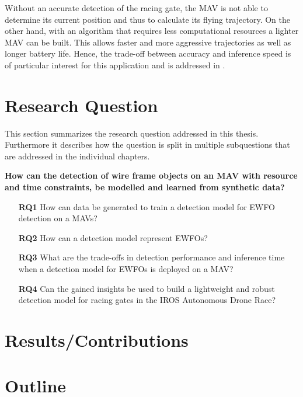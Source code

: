 Without an accurate detection of the racing gate, the \ac{MAV} is not able to determine its current position and thus to calculate its flying trajectory. On the other hand, with an algorithm that requires less computational resources a lighter \ac{MAV} can be built. This allows faster and more aggressive trajectories as well as longer battery life. Hence, the trade-off between accuracy and inference speed is of particular interest for this application and is addressed in .

\section{Research Question}

This section summarizes the research question addressed in this thesis. Furthermore it describes how the question is split in multiple subquestions that are addressed in the individual chapters.

	\textbf{How can the detection of wire frame objects on an \ac{MAV} with resource and time constraints, be modelled and learned from synthetic data?}


\begin{enumerate}
	\item[\textbf{RQ1}]How can data be generated to train a detection model for \ac{EWFO} detection on a \acp{MAV}?
	\item[\textbf{RQ2}]How can a detection model represent \acp{EWFO}?
	\item[\textbf{RQ3}]What are the trade-offs in detection performance and inference time when a detection model for \acp{EWFO} is deployed on a \ac{MAV}?
	\item[\textbf{RQ4}]Can the gained insights be used to build a lightweight and robust detection model for racing gates in the \ac{IROS} Autonomous Drone Race?
\end{enumerate}

\section{Results/Contributions}


\section{Outline}


